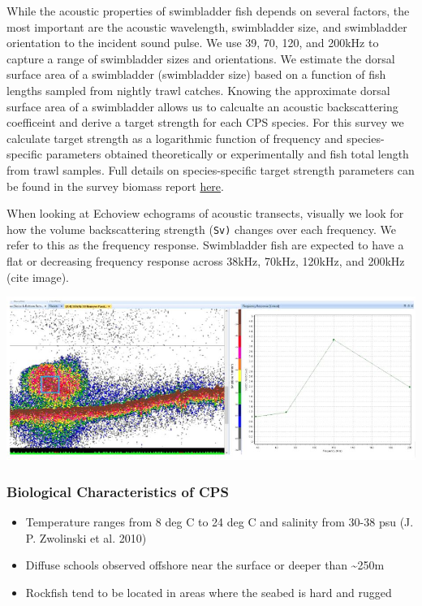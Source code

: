 \documentclass[
  letterpaper,
  oneside,
  open=any]{scrbook}
\begin{document}
While the acoustic properties of swimbladder fish depends on several
factors, the most important are the acoustic wavelength, swimbladder
size, and swimbladder orientation to the incident sound pulse. We use
39, 70, 120, and 200kHz to capture a range of swimbladder sizes and
orientations. We estimate the dorsal surface area of a swimbladder
(swimbladder size) based on a function of fish lengths sampled from
nightly trawl catches. Knowing the approximate dorsal surface area of a
swimbladder allows us to calcualte an acoustic backscattering
coefficeint and derive a target strength for each CPS species. For this
survey we calculate target strength as a logarithmic function of
frequency and species-specific parameters obtained theoretically or
experimentally and fish total length from trawl samples. Full details on
species-specific target strength parameters can be found in the survey
biomass report
\href{chrome-extension://efaidnbmnnnibpcajpcglclefindmkaj/https://swfsc-publications.fisheries.noaa.gov/publications/CR/2024/2024Stierhoff.pdf}{here}.

When looking at Echoview echograms of acoustic transects, visually we
look for how the volume backscattering strength (\texttt{Sv)} changes
over each frequency. We refer to this as the frequency response.
Swimbladder fish are expected to have a flat or decreasing frequency
response across 38kHz, 70kHz, 120kHz, and 200kHz (cite image).

\label{frequency}
\includegraphics{content/images/CPS-freq-response.JPG}

\subsubsection{\texorpdfstring{\textbf{Biological Characteristics of
CPS}}{Biological Characteristics of CPS}}\label{biological-characteristics-of-cps}

\begin{itemize}
\item
  Temperature ranges from 8 deg C to 24 deg C and salinity from 30-38
  psu (J. P. Zwolinski et al. 2010)
\item
  Diffuse schools observed offshore near the surface or deeper than
  \textasciitilde250m
\item
  Rockfish tend to be located in areas where the seabed is hard and
  rugged
\end{itemize}
\end{document}
